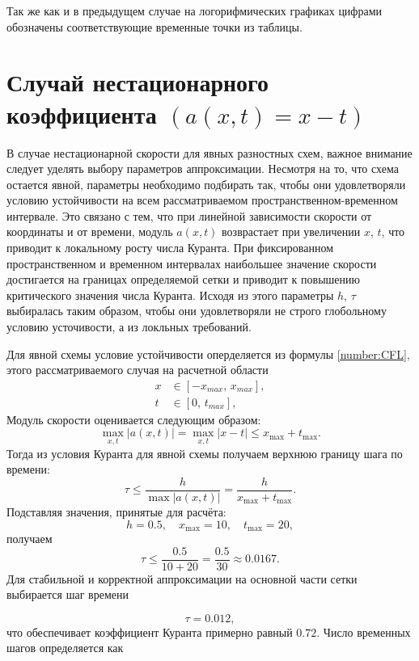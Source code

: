 \documentclass[a4paper,14pt]{extreport}
\begin{document}
Так же как и в предыдущем случае на логорифмических графиках цифрами обозначены соответствующие временные точки из таблицы.


\section*{{Случай нестационарного коэффициента $(a(x,t)=x-t)$}}

В случае нестационарной скорости для явных разностных схем, важное внимание следует уделять выбору параметров аппроксимации. Несмотря на то, что схема остается явной, параметры необходимо подбирать так, чтобы они удовлетворяли условию устойчивости на всем рассматриваемом пространственном-временном интервале. Это связано с тем, что при линейной зависимости скорости от координаты и от времени, модуль $a(x,t)$ возврастает при увеличении $x$, $t$, что приводит к локальному росту числа Куранта. При фиксированном пространственном и временном интервалах наибольшее значение скорости достигается на границах определяемой сетки и приводит к повышению критического значения числа Куранта. Исходя из этого параметры $h$, $\tau$ выбиралась таким образом, чтобы они удовлетворяли не строго глобольному условию усточивости, а из локльных требований. 

Для явной схемы условие устойчивости оперделяется из формулы \ref{number:CFL}, этого рассматриваемого случая на расчетной области
\[
\begin{aligned}
	x &\in [-x_{max},\, x_{max}],\\
	t &\in [0,\, t_{max}],
\end{aligned}
\]
Модуль скорости оценивается следующим образом:
\begin{equation}
	\max_{x,t} |a(x,t)| = \max_{x,t} |x - t| \le x_{\max} + t_{\max}.
\end{equation}
Тогда из условия Куранта для явной схемы получаем верхнюю границу шага по времени:
\begin{equation}
	\tau \le \frac{h}{\max|a(x,t)|} = \frac{h}{x_{\max} + t_{\max}}.
\end{equation}
Подставляя значения, принятые для расчёта:
\[
h = 0.5, \quad x_{\max} = 10, \quad t_{\max} = 20,
\]
получаем
\[
\tau \le \frac{0.5}{10 + 20} = \frac{0.5}{30} \approx 0.0167.
\]
Для стабильной и корректной аппроксимации на основной части сетки выбирается шаг времени

\begin{equation}
	\tau = 0.012,
\end{equation}
что обеспечивает коэффициент Куранта примерно равный \(0.72\).
Число временных шагов определяется как
\end{document}
